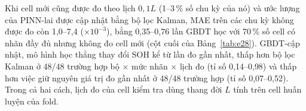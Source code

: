 Khi cell mới cũng được đo theo lịch $0{,}1L$ (1--3\,\% số chu kỳ của nó) và ước lượng của PINN-lai được cập nhật bằng bộ lọc Kalman, MAE trên các chu kỳ không được đo còn 1{,}0--7{,}4 ($\times10^{-3}$), bằng 0{,}35--0{,}76 lần GBDT học với 70\,\% số cell có nhãn đầy đủ nhưng không đo cell mới (cột cuối của Bảng~\ref{tab:e28}). GBDT-cập nhật, mô hình học thẳng thay đổi SOH kể từ lần đo gần nhất, thấp hơn bộ lọc Kalman ở 48/48 trường hợp bộ $\times$ mức nhãn $\times$ lịch đo (tỉ số 0{,}14--0{,}98) và thấp hơn việc giữ nguyên giá trị đo gần nhất ở 48/48 trường hợp (tỉ số 0{,}07--0{,}52). Trong cả hai cách, lịch đo của cell kiểm tra dùng thang đời $L$ tính trên cell huấn luyện của fold.
